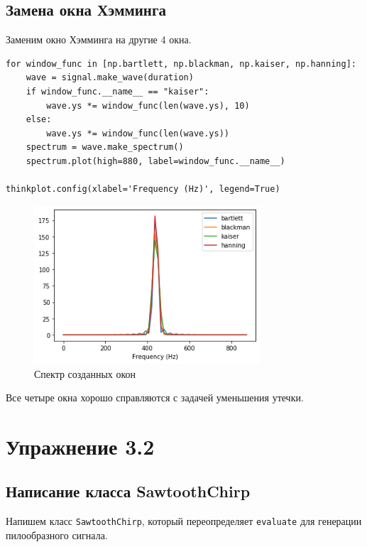 \documentclass[a4paper,12pt]{report}
\begin{document}
\section{Замена окна Хэмминга}

Заменим окно Хэмминга на другие 4 окна.

\begin{lstlisting}[caption=Создание других окон]
for window_func in [np.bartlett, np.blackman, np.kaiser, np.hanning]:
    wave = signal.make_wave(duration)
    if window_func.__name__ == "kaiser":
        wave.ys *= window_func(len(wave.ys), 10)
    else:
        wave.ys *= window_func(len(wave.ys))
    spectrum = wave.make_spectrum()
    spectrum.plot(high=880, label=window_func.__name__)

thinkplot.config(xlabel='Frequency (Hz)', legend=True)
\end{lstlisting}

\begin{figure}[H]
        \centering
        \includegraphics[width=0.75\textwidth]{lab3_fig1_2.png}
        \caption{Спектр созданных окон}
        \label{fig:lab3_fig1_2}
\end{figure}

Все четыре окна хорошо справляются с задачей уменьшения утечки.

\chapter{Упражнение 3.2}
\section{Написание класса SawtoothChirp}

Напишем класс \texttt{SawtoothChirp}, который переопределяет \texttt{evaluate} для генерации пилообразного сигнала.
\end{document}
